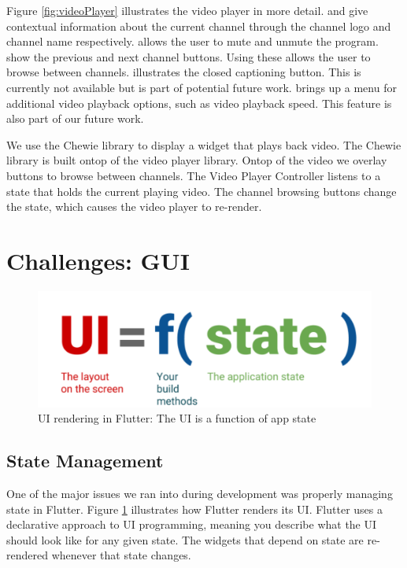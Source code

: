\documentclass[conference]{IEEEtran}
\begin{document}
Figure \ref{fig:videoPlayer} illustrates the video player in more detail.  and  give contextual information about the current channel through the channel logo and channel name respectively.  allows the user to mute and unmute the program.  show the previous and next channel buttons. Using these allows the user to browse between channels.  illustrates the closed captioning button. This is currently not available but is part of potential future work.  brings up a menu for additional video playback options, such as video playback speed. This feature is also part of our future work.

We use the Chewie \cite{chewie_library} library to display a widget that plays back video. The Chewie library is built ontop of the video player \cite{video_player_library} library. Ontop of the video we overlay buttons to browse between channels. The Video Player Controller listens to a state that holds the current playing video. The channel browsing buttons change the state, which causes the video player to re-render.

\section{Challenges: GUI}
\begin{figure}[h]
	\centerline{\includegraphics[width=\linewidth]{figures/UI-rendering-flutter}}
	\caption{UI rendering in Flutter: The UI is a function of app state \cite{Flutter_UI_Rendering}}
	\label{fig:ui-rendering-flutter}
\end{figure}
\subsection{State Management}
One of the major issues we ran into during development was properly managing state in Flutter. Figure \ref{fig:ui-rendering-flutter} illustrates how Flutter renders its UI. Flutter uses a declarative approach to UI programming, meaning you describe what the UI should look like for any given state. The widgets that depend on state are re-rendered whenever that state changes. \\\par
\end{document}
